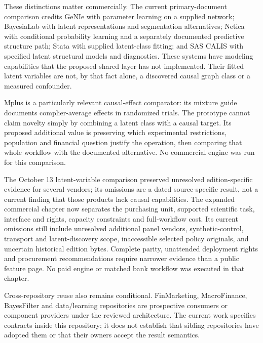 \citep{sp13_choices,sp13_interfaces}

These distinctions matter commercially. The current primary-document
comparison credits GeNIe with parameter learning on a supplied network;
BayesiaLab with latent representations and segmentation alternatives;
Netica with conditional probability learning and a separately documented
predictive structure path; Stata with supplied latent-class fitting; and
SAS CALIS with specified latent structural models and diagnostics. These
systems have modeling capabilities that the proposed shared layer has
not implemented. Their fitted latent variables are not, by that fact
alone, a discovered causal graph class or a measured confounder.
\citep{exec13_latent_genie_parameters,
exec13_latent_bayesia_data,exec13_latent_netica_algorithms,
exec13_latent_stata_lca,exec13_latent_sas_calis}

Mplus is a particularly relevant causal-effect comparator: its mixture
guide documents complier-average effects in randomized trials. The
prototype cannot claim novelty simply by combining a latent class with a
causal target. Its proposed additional value is preserving which
experimental restrictions, population and financial question justify the
operation, then comparing that whole workflow with the documented
alternative. No commercial engine was run for this comparison.
\citep{exec13_latent_mplus}

The October 13 latent-variable comparison preserved unresolved
edition-specific evidence for several vendors; its omissions are a dated
source-specific result, not a current finding that those products lack
causal capabilities. The expanded commercial chapter now separates the
purchasing unit, supported scientific task, interface and rights,
capacity constraints and full-workflow cost. Its current omissions still
include unresolved additional panel vendors, synthetic-control,
transport and latent-discovery scope, inaccessible selected policy
originals, and uncertain historical edition bytes. Complete parity,
unattended deployment rights and procurement recommendations require
narrower evidence than a public feature page. No paid engine or matched
bank workflow was executed in that chapter.
\citep{sp13_commercial,sp18_commercial}

Cross-repository reuse also remains conditional. FinMarketing,
MacroFinance, BayesFilter and data/learning repositories are prospective
consumers or component providers under the reviewed architecture. The
current work specifies contracts inside this repository; it does not
establish that sibling repositories have adopted them or that their
owners accept the result semantics. \citep{sp13_interfaces}

